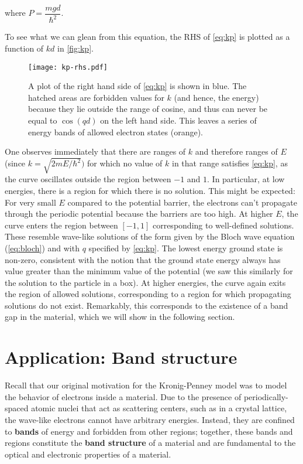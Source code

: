 \noindent where $P = \dfrac{mgd}{\hbar^2}$.

To see what we can glean from this equation, the RHS of \autoref{eq:kp} is plotted as a function of $kd$ in \autoref{fig:kp}.

\begin{figure}[!h]
	\centering 
	\texttt{[image: kp-rhs.pdf]}
	\caption{A plot of the right hand side of \autoref{eq:kp} is shown in blue. 
	The hatched areas are forbidden values for $k$ (and hence, the energy) because they lie outside the range of cosine, and thus can never be equal to $\cos(qd)$ on the left hand side. 
	This leaves a series of energy bands of allowed electron states (orange).}
	\label{fig:kp}
\end{figure}

One observes immediately that there are ranges of $k$ and therefore ranges of $E$ (since $k = \sqrt{2mE/\hbar^2})$ for which no value of $k$ in that range satisfies \autoref{eq:kp}, as the curve oscillates outside the region between $-1$ and $1$. 
In particular, at low energies, there is a region for which there is no solution. 
This might be expected: For very small $E$ compared to the potential barrier, the electrons can't propagate through the periodic potential because the barriers are too high. 
At higher $E$, the curve enters the region between $[-1,1]$ corresponding to well-defined solutions. 
These resemble wave-like solutions of the form given by the Bloch wave equation (\autoref{eq:bloch}) and with $q$ specified by \autoref{eq:kp}. 
The lowest energy ground state is non-zero, consistent with the notion that the ground state energy always has value greater than the minimum value of the potential (we saw this similarly for the solution to the particle in a box). 
At higher energies, the curve again exits the region of allowed solutions, corresponding to a region for which propagating solutions do not exist. 
Remarkably, this corresponds to the existence of a band gap in the material, which we will show in the following section.


\section{Application: Band structure}

Recall that our original motivation for the Kronig-Penney model was to model the behavior of electrons inside a material. 
Due to the presence of periodically-spaced atomic nuclei that act as scattering centers, such as in a crystal lattice, the wave-like electrons cannot have arbitrary energies. 
Instead, they are confined to \textbf{bands} of energy and forbidden from other regions; together, these bands and regions constitute the \textbf{band structure} of a material and are fundamental to the optical and electronic properties of a material. 


